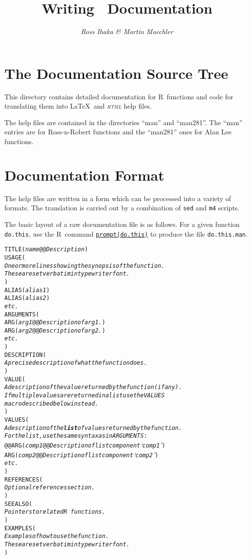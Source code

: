 \documentclass[a4paper]{article}
\title{\textbf{Writing \R\ Documentation}}
\author{\textit{Ross Ihaka \& Martin Maechler}}
\newenvironment{display}[0]%
 {\begin{list}{}{\setlength{\leftmargin}{30pt}}\item}%
 {\end{list}}
\newcommand{\HTML}{\textsc{html}}
\newcommand{\R}{\textsc{R}}
\begin{document}
\maketitle

\section{The Documentation Source Tree}

This directory contains detailed documentation for \R\ functions and code
for translating them into \LaTeX\ and \emph{\HTML} help files.

The help files are contained in the directories ``man'' and ``man281''.
The ``man'' entries are for Ross-n-Robert functions and the ``man281''
ones for Alan Lee functions.

\section{Documentation Format}\label{sec:doc-format}

The help files are written in a form which can be processed
into a variety of formats.  The translation is carried out
by a combination of \texttt{sed} and \texttt{m4} scripts.

The basic layout of a raw documentation file is as follows.
For a given function \texttt{do.this}, use the \R\ command
\underline{\texttt{prompt(do.this)}} to produce the file \texttt{do.this.man}.
\begin{display}
\begin{alltt}
TITLE(\textit{name} @@ \textit{Description})
USAGE(
\textit{One or more lines showing the synopsis of the function.
These are set verbatim in typewriter font.}
)
ALIAS(\textit{alias 1})
ALIAS(\textit{alias 2})
\textit{etc.}
ARGUMENTS(
ARG(\textit{arg1} @@ \textit{Description of arg1.})
ARG(\textit{arg2} @@ \textit{Description of arg2.})
\textit{etc.}
)
DESCRIPTION(
\textit{A precise description of what the function does.}
)
VALUE(
\textit{A description of the value returned by the function (if any).
If multiple values are returned in a list use the \texttt{VALUES}
macro described below instead.}
)
VALUES(
{\textit{A description of the \textbf{list} of values returned by the function.
For the list, use the same syntax as in ARGUMENTS}:
@@\samepage}\pagebreak[3]
ARG(\textit{comp1} @@ \textit{Description of list component `comp1'})
ARG(\textit{comp2} @@ \textit{Description of list component `comp2'})
\textit{etc.}
)
REFERENCES(
\textit{Optional references section.}
)
SEEALSO(
\textit{Pointers to related \R\ functions.}
)
EXAMPLES(
\textit{Examples of how to use the function.
These are set verbatim in typewriter font.}
)
\end{alltt}
\end{display}
\end{document}
